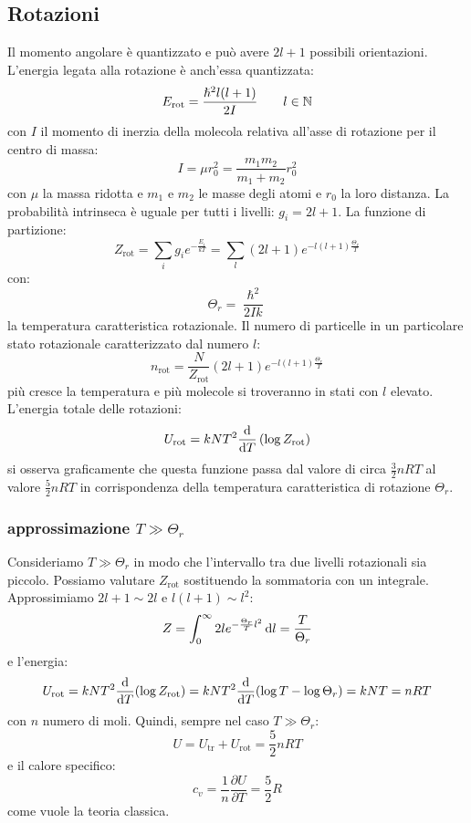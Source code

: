 \subsection{Rotazioni}
Il momento angolare è quantizzato e può avere $2l+1$ possibili orientazioni.
L'energia legata alla rotazione è anch'essa quantizzata:
\begin{equation}
	E_\text{rot}=\frac{\hslash^2l(l+1)}{2I}\qquad l\in\mathbb{N}
\end{equation}
con $I$ il momento di inerzia della molecola relativa all'asse di rotazione per il centro di massa:
\begin{equation}
	I=\mu r_0^2=\frac{m_1m_2}{m_1+m_2}r_0^2
\end{equation}
con $\mu$ la massa ridotta e $m_1$ e $m_2$ le masse degli atomi e $r_0$ la loro distanza. La probabilità intrinseca è uguale per tutti i livelli: $g_i=2l+1$.  La funzione di partizione:
\begin{equation}
	Z_\text{rot}=\sum_i g_i e^{-\frac{E_i}{kT}}=\sum_l(2l+1)e^{-l(l+1)\frac{\Theta_r}{T}}
\end{equation}
con:
\begin{equation}
	\Theta_r=\frac{\hslash^2}{2Ik}
\end{equation}
la temperatura caratteristica rotazionale. Il numero di particelle in un particolare stato rotazionale caratterizzato dal numero $l$:
\begin{equation}
	n_\text{rot}=\frac{N}{Z_\text{rot}}(2l+1)e^{-l(l+1)\frac{\Theta_r}{T}}
\end{equation}
più cresce la temperatura e più molecole si troveranno in stati con $l$ elevato. L'energia totale delle rotazioni:
\begin{equation}
	U_\text{rot}=kNT^2\frac{\mathrm{d}}{\mathrm{d} T}\left(\log Z_\text{rot}\right)
\end{equation}
si osserva graficamente che questa funzione passa dal valore di circa $\frac{3}{2}nRT$ al valore $\frac{5}{2}nRT$ in corrispondenza della temperatura caratteristica di rotazione $\Theta_r$.
\subsubsection{approssimazione $T\gg\Theta_r$}
Consideriamo $T\gg\Theta_r$ in modo che l'intervallo tra due livelli rotazionali sia piccolo. Possiamo valutare $Z_\text{rot}$ sostituendo la sommatoria con un integrale. Approssimiamo $2l+1\sim 2l$ e $l(l+1)\sim l^2$:
\begin{equation}
	Z=\int_0^\infty 2le^{-\frac{\Theta_r}{T}l^2}\,\mathrm{d} l=\frac{T}{\Theta_r}
\end{equation}
e l'energia:
\begin{equation}
	U_\text{rot}=kNT^2\frac{\mathrm{d}}{\mathrm{d} T}(\log Z_\text{rot})=kNT^2\frac{\mathrm{d}}{\mathrm{d} T}(\log{T}-\log{\Theta_r})=kNT=nRT
\end{equation}
con $n$ numero di moli. Quindi, sempre nel caso $T\gg\Theta_r$:
\begin{equation}
	U=U_\text{tr}+U_\text{rot}=\frac{5}{2}nRT
\end{equation}
e il calore specifico:
\begin{equation}
	c_v=\frac{1}{n}\frac{\partial U}{\partial T}=\frac{5}{2}R
\end{equation}
come vuole la teoria classica.
